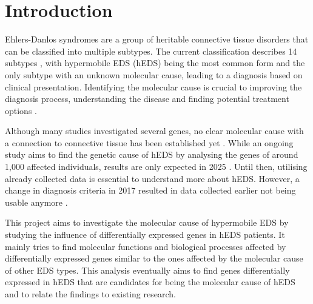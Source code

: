 \section{Introduction}


Ehlers-Danlos syndromes are a group of heritable connective tissue disorders that can be classified into multiple subtypes. The current classification describes 14 subtypes \cite{classification2017, Malfait2020}, with hypermobile EDS (hEDS) being the most common form and the only subtype with an unknown molecular cause, leading to a diagnosis based on clinical presentation. Identifying the molecular cause is crucial to improving the diagnosis process, understanding the disease and finding potential treatment options \cite{Ritelli2020}.

Although many studies investigated several genes, no clear molecular cause with a connection to connective tissue has been established yet \cite{Caliogna2021}. While an ongoing study aims to find the genetic cause of hEDS by analysing the genes of around 1,000 affected individuals, results are only expected in 2025 \cite{HEDGE}. Until then, utilising already collected data is essential to understand more about hEDS. However, a change in diagnosis criteria in 2017 resulted in data collected earlier not being usable anymore \cite{Gensemer2021, Ritelli2022}.
%
%

This project aims to investigate the molecular cause of hypermobile EDS by studying the influence of differentially expressed genes in hEDS patients. It mainly tries to find molecular functions and biological processes affected by differentially expressed genes similar to the ones affected by the molecular cause of other EDS types. This analysis eventually aims to find genes differentially expressed in hEDS that are candidates for being the molecular cause of hEDS and to relate the findings to existing research.